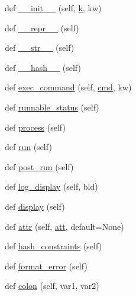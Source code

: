\begin{DoxyCompactItemize}
\item 
def \hyperlink{classwaflib_1_1_task_1_1_task_base_add6ae927b00bd1f14d5b87738dd53e70}{\+\_\+\+\_\+init\+\_\+\+\_\+} (self, \hyperlink{rfft2d_test_m_l_8m_adc468c70fb574ebd07287b38d0d0676d}{k}, kw)
\item 
def \hyperlink{classwaflib_1_1_task_1_1_task_base_a004a67fbb5d7e36d1a6ba48390e0d5f7}{\+\_\+\+\_\+repr\+\_\+\+\_\+} (self)
\item 
def \hyperlink{classwaflib_1_1_task_1_1_task_base_a07123f80c95b1d17a699064cd10d8885}{\+\_\+\+\_\+str\+\_\+\+\_\+} (self)
\item 
def \hyperlink{classwaflib_1_1_task_1_1_task_base_a5e02f89716bcd37b2490adc0861c4bdd}{\+\_\+\+\_\+hash\+\_\+\+\_\+} (self)
\item 
def \hyperlink{classwaflib_1_1_task_1_1_task_base_a6326ff82d67a2b629c8d78b95cb8fec6}{exec\+\_\+command} (self, \hyperlink{sndfile__play_8m_adfc5ba7e22f5e4a6221c12a70503bef3}{cmd}, kw)
\item 
def \hyperlink{classwaflib_1_1_task_1_1_task_base_a10c4597d9085bd1680f9b3eb28e23899}{runnable\+\_\+status} (self)
\item 
def \hyperlink{classwaflib_1_1_task_1_1_task_base_ae5e951a187c8d09c31960bbcf76fad25}{process} (self)
\item 
def \hyperlink{classwaflib_1_1_task_1_1_task_base_ae549bc1a80fd94cc94fd1e764c76895c}{run} (self)
\item 
def \hyperlink{classwaflib_1_1_task_1_1_task_base_a21b09d3f18df76e1d8b0719f321ea3bd}{post\+\_\+run} (self)
\item 
def \hyperlink{classwaflib_1_1_task_1_1_task_base_adf380fd031fc987f4dcd54e1f70420a7}{log\+\_\+display} (self, bld)
\item 
def \hyperlink{classwaflib_1_1_task_1_1_task_base_a838316cf55ac50fab2ae0e8771917e74}{display} (self)
\item 
def \hyperlink{classwaflib_1_1_task_1_1_task_base_a8ead2ec09545f4e9e27d6b40f9f80eaa}{attr} (self, \hyperlink{filters_8h_a6cbe32dd86cefd1a8b182b3ee652e9bf}{att}, default=None)
\item 
def \hyperlink{classwaflib_1_1_task_1_1_task_base_ad4f2583a59ff62565735490154826033}{hash\+\_\+constraints} (self)
\item 
def \hyperlink{classwaflib_1_1_task_1_1_task_base_a321e667402035aa56626ee6f7b3b8223}{format\+\_\+error} (self)
\item 
def \hyperlink{classwaflib_1_1_task_1_1_task_base_ae9648ec691e059291a79f38ef6ee12cc}{colon} (self, var1, var2)
\item 

\end{DoxyCompactItemize}
